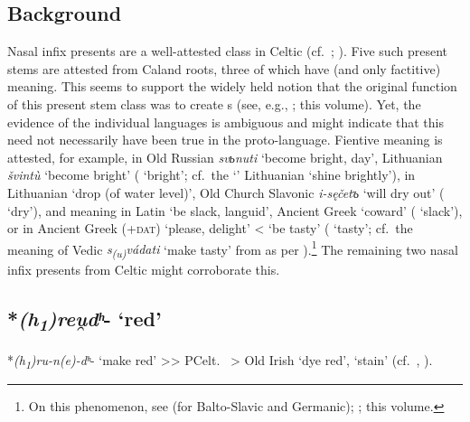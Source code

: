 \documentclass[output=paper,colorlinks,citecolor=brown]{langscibook}
\begin{document}
\subsection{Background}
Nasal infix presents  are a well-attested class in Celtic (cf.\ \citealt{McCone1991}; \citealt[42--45]{Schumacher2004}). Five such present stems are attested from Caland roots, three of which have  (and only factitive) meaning. This seems to support the widely held notion that the original function of this present stem class was to create s (see, e.g., \citealt[143--146]{Rau2009}; this volume). Yet, the evidence of the individual languages is ambiguous and might indicate that this need not necessarily have been true in the proto-language. Fientive meaning is attested, for example, in Old Russian \textit{svьnuti} ‘become bright, day’, Lithuanian \textit{švintù} ‘become bright’ ( ‘bright’; cf.\ the `' Lithuanian  ‘shine brightly’), in Lithuanian  ‘drop (of water level)’, Old Church Slavonic \textit{i-sęčetъ} ‘will dry out’ ( ‘dry’), and  meaning in Latin  ‘be slack, languid’, Ancient Greek  ‘coward’ ( ‘slack’), or in Ancient Greek  (+\textsc{dat}) ‘please, delight’ < ‘be tasty’ ( ‘tasty’; cf.\ the  meaning of Vedic   \textit{s\textsubscript{(u)}vádati} ‘make tasty’ from  as per ).\footnote{On this phenomenon, see \citet{Gorbachov2007} (for Balto-Slavic and Germanic); \citet[146, n.\ 68]{Rau2009}; this volume.} The remaining two nasal infix presents  from Celtic might corroborate this.

\subsection{*\textit{(h\textsubscript{1})reu̯dʰ}- ‘red’}
\label{sec:NIPred}

*\textit{(h\textsubscript{1})ru-n(e)-dʰ}-   ‘make red’ {>}{>} PCelt.\  > Old Irish   ‘dye red’,  ‘stain’ (cf.\ \citealt[553--554]{Schumacher2004}, ).
\end{document}
